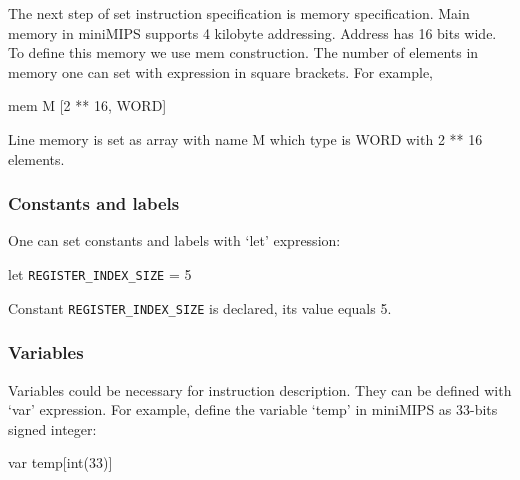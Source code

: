 \documentclass[oneside,final,12pt]{extreport}
\begin{document}
\bigskip

The next step of set instruction specification is memory specification. Main memory in miniMIPS supports 4 kilobyte addressing. Address has 16 bits wide. To define this memory we use mem construction. The number of elements in memory one can set with expression in square brackets. For example,

\bigskip


mem M [2 ** 16, WORD]

\bigskip

Line memory is set as array with name M which type is WORD with 2 ** 16 elements.


\bigskip
\bigskip


\subsubsection*{Constants and labels}

\bigskip

One can set constants and labels with ‘let’ expression:

\bigskip

let \lstinline!REGISTER_INDEX_SIZE! = 5


\bigskip

Constant \lstinline!REGISTER_INDEX_SIZE! is declared, its value equals 5. 

 


\bigskip
\bigskip



\subsubsection*{Variables}

\bigskip

Variables could be necessary for instruction description. They can be defined with ‘var’ expression. For example, define the variable ‘temp’ in miniMIPS as 33-bits signed integer:

\bigskip
var temp[int(33)]
\end{document}
